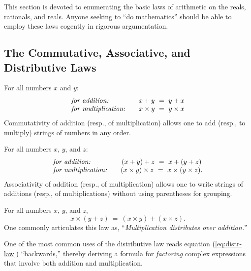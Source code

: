 This section is devoted to enumerating the basic laws of arithmetic on
the reals, rationals, and reals.  Anyone seeking to ``do mathematics''
should be able to employ these laws cogently in rigorous argumentation.

\subsection{The Commutative, Associative, and Distributive Laws} 

For all numbers $x$ and $y$:
\[
\begin{array}{llc}
\mbox{\it for addition:}
  & & x+y \ = \ y+x  \index{commutativity of addition} \\
\mbox{\it for multiplication:}
  & & x \times y \ = \ y \times x \index{commutativity of multiplication}
\end{array}
\]
Commutativity of addition (resp., of multiplication) allows one to add
(resp., to multiply) strings of numbers in any order. 

\medskip

For all numbers $x$, $y$, and $z$:
\[
\begin{array}{llc}
\mbox{\it for addition:}
  & &
(x+y)+z \ = \ x+(y+z) \\
\mbox{\it for multiplication:}
  & & 
(x \times y) \times z \ = \ x \times (y \times z).
\end{array}
\] 
Associativity of addition (resp., of multiplication) allows one to
write strings of additions (resp., of multiplications) without using
parentheses for grouping.

\medskip

For all numbers $x$, $y$, and $z$,
\begin{equation}
\label{eq:distr-law}
x \times (y + z) \ = \ (x \times y) + (x \times z).
\end{equation}
One commonly articulates this law as, ``{\em Multiplication
  distributes over addition.}''

\smallskip

One of the most common uses of the distributive law reads equation
(\ref{eq:distr-law}) ``backwards,'' thereby deriving a formula for
{\em factoring}  complex expressions that
involve both addition and multiplication.

